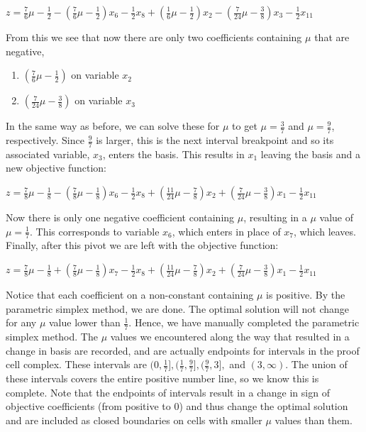 \documentclass{article}
\begin{document}
\begin{center}
    $z = \frac{7}{6}\mu - \frac{1}{2}-(\frac{7}{6}\mu -\frac{1}{2})x_6 - \frac{1}{2}x_8 + (\frac{1}{6}\mu - \frac{1}{2})x_2 - (\frac{7}{24}\mu -\frac{3}{8})x_3 - \frac{1}{2}x_{11}$
\end{center}

From this we see that now there are only two coefficients containing $\mu$ that are negative, 

\begin{enumerate}
    \item $(\frac{7}{6}\mu - \frac{1}{2})$ on variable $x_2$
    \item $(\frac{7}{24}\mu - \frac{3}{8})$ on variable $x_3$
\end{enumerate}

In the same way as before, we can solve these for $\mu$ to get $\mu = \frac{3}{7}$ and $\mu = \frac{9}{7}$, respectively. Since $\frac{9}{7}$ is larger, this is the next interval breakpoint and so its associated variable, $x_3$, enters the basis. This results in $x_1$ leaving the basis and a new objective function:

\begin{center}
    $z = \frac{7}{8}\mu - \frac{1}{8}-(\frac{7}{8}\mu -\frac{1}{8})x_6 - \frac{1}{2}x_8 + (\frac{11}{24}\mu - \frac{7}{8})x_2 + (\frac{7}{24}\mu -\frac{3}{8})x_1 - \frac{1}{2}x_{11}$
\end{center}

Now there is only one negative coefficient containing $\mu$, resulting in a $\mu$ value of $\mu = \frac{1}{7}$. This corresponds to variable $x_6$, which enters in place of $x_7$, which leaves. Finally, after this pivot we are left with the objective function:

\begin{center}
    $z = \frac{7}{8}\mu - \frac{1}{8}+(\frac{7}{8}\mu -\frac{1}{8})x_7 - \frac{1}{2}x_8 + (\frac{11}{24}\mu - \frac{7}{8})x_2 + (\frac{7}{24}\mu -\frac{3}{8})x_1 - \frac{1}{2}x_{11}$
\end{center}

Notice that each coefficient on a non-constant containing $\mu$ is positive. By the parametric simplex method, we are done. The optimal solution will not change for any $\mu$ value lower than $\frac{1}{7}$. Hence, we have manually completed the parametric simplex method. The $\mu$ values we encountered along the way that resulted in a change in basis are recorded, and are actually endpoints for intervals in the proof cell complex. These intervals are $(0, \frac{1}{7}], (\frac{1}{7}, \frac{9}{7}], (\frac{9}{7}, 3],$ and $(3, \infty)$. The union of these intervals covers the entire positive number line, so we know this is complete. Note that the endpoints of intervals result in a change in sign of objective coefficients (from positive to 0) and thus change the optimal solution and are included as closed boundaries on cells with smaller $\mu$ values than them.
\end{document}
